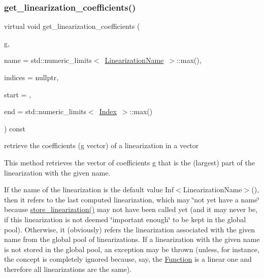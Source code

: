 \subsubsection{\texorpdfstring{get\+\_\+linearization\+\_\+coefficients()}{get\_linearization\_coefficients()}\hspace{0.1cm}{\footnotesize\ttfamily [1/2]}}
{\footnotesize\ttfamily virtual void get\+\_\+linearization\+\_\+coefficients (\begin{DoxyParamCaption}\item[{\mbox{\hyperlink{class_s_m_spp__di__unipi__it_1_1_function_a9ad432406b609e28d340f73e9474bffe}{Function\+Value}} $\ast$}]{g,  }\item[{const \mbox{\hyperlink{class_s_m_spp__di__unipi__it_1_1_c05_function_ae90bf93c6d4b4ada66791c735d1c03cc}{Linearization\+Name}}}]{name = {\ttfamily std\+:\+:numeric\+\_\+limits$<$~\mbox{\hyperlink{class_s_m_spp__di__unipi__it_1_1_c05_function_ae90bf93c6d4b4ada66791c735d1c03cc}{Linearization\+Name}}~$>$\+:\+:max()},  }\item[{\mbox{\hyperlink{group___thin_var_dep_interface___c_l_a_s_s_e_s_ga03461123d4f6090aefeb97ef653d3f2b}{c\+\_\+\+Vec\+\_\+\+Index}} $\ast$const}]{indices = {\ttfamily nullptr},  }\item[{\mbox{\hyperlink{group___thin_var_dep_interface___c_l_a_s_s_e_s_gaee6156e2ce80720d57a082d80f39d8cc}{c\+\_\+\+Index}}}]{start = {},  }\item[{\mbox{\hyperlink{group___thin_var_dep_interface___c_l_a_s_s_e_s_gaee6156e2ce80720d57a082d80f39d8cc}{c\+\_\+\+Index}}}]{end = {\ttfamily std\+:\+:numeric\+\_\+limits$<$~\mbox{\hyperlink{group___thin_var_dep_interface___c_l_a_s_s_e_s_gad53d6229d7ec28555a9c9c2fd9abf773}{Index}}~$>$\+:\+:max()} }\end{DoxyParamCaption}) const\hspace{0.3cm}{\ttfamily [pure virtual]}}



retrieve the coefficients (g vector) of a linearization in a vector 

This method retrieves the vector of coefficients g that is the (largest) part of the linearization with the given name.

If the name of the linearization is the default value Inf$<$\+Linearization\+Name$>$(), then it refers to the last computed linearization, which may \char`\"{}not yet have a name\char`\"{} because \mbox{\hyperlink{class_s_m_spp__di__unipi__it_1_1_c05_function_ac477d0c3276fa28127d5aff69f31c367}{store\+\_\+linearization()}} may not have been called yet (and it may never be, if this linearization is not deemed \char`\"{}important enough\char`\"{} to be kept in the global pool). Otherwise, it (obviously) refers the linearization associated with the given name from the global pool of linearizations. If a linearization with the given name is not stored in the global pool, an exception may be thrown (unless, for instance, the concept is completely ignored because, say, the \mbox{\hyperlink{class_s_m_spp__di__unipi__it_1_1_function}{Function}} is a linear one and therefore all linearizations are the same).

